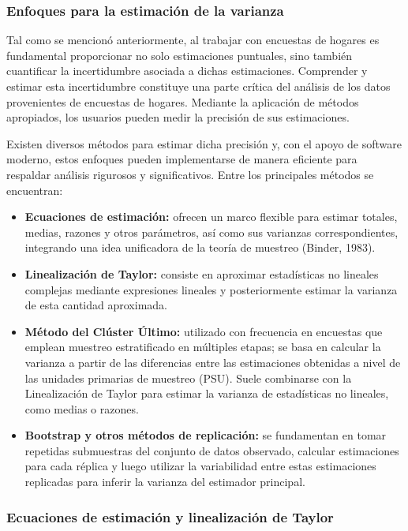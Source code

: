 \documentclass[
  spanish,
  12pt,
]{book}
\begin{document}
\subsubsection{Enfoques para la estimación de la varianza}\label{enfoques-para-la-estimaciuxf3n-de-la-varianza}

Tal como se mencionó anteriormente, al trabajar con encuestas de hogares es fundamental proporcionar no solo estimaciones puntuales, sino también cuantificar la incertidumbre asociada a dichas estimaciones. Comprender y estimar esta incertidumbre constituye una parte crítica del análisis de los datos provenientes de encuestas de hogares. Mediante la aplicación de métodos apropiados, los usuarios pueden medir la precisión de sus estimaciones.

Existen diversos métodos para estimar dicha precisión y, con el apoyo de software moderno, estos enfoques pueden implementarse de manera eficiente para respaldar análisis rigurosos y significativos. Entre los principales métodos se encuentran:

\begin{itemize}
\item
  \textbf{Ecuaciones de estimación:} ofrecen un marco flexible para estimar totales, medias, razones y otros parámetros, así como sus varianzas correspondientes, integrando una idea unificadora de la teoría de muestreo (Binder, 1983).
\item
  \textbf{Linealización de Taylor:} consiste en aproximar estadísticas no lineales complejas mediante expresiones lineales y posteriormente estimar la varianza de esta cantidad aproximada.
\item
  \textbf{Método del Clúster Último:} utilizado con frecuencia en encuestas que emplean muestreo estratificado en múltiples etapas; se basa en calcular la varianza a partir de las diferencias entre las estimaciones obtenidas a nivel de las unidades primarias de muestreo (PSU). Suele combinarse con la Linealización de Taylor para estimar la varianza de estadísticas no lineales, como medias o razones.
\item
  \textbf{Bootstrap y otros métodos de replicación:} se fundamentan en tomar repetidas submuestras del conjunto de datos observado, calcular estimaciones para cada réplica y luego utilizar la variabilidad entre estas estimaciones replicadas para inferir la varianza del estimador principal.
\end{itemize}

\subsubsection*{Ecuaciones de estimación y linealización de Taylor}\label{ecuaciones-de-estimaciuxf3n-y-linealizaciuxf3n-de-taylor}
\end{document}
